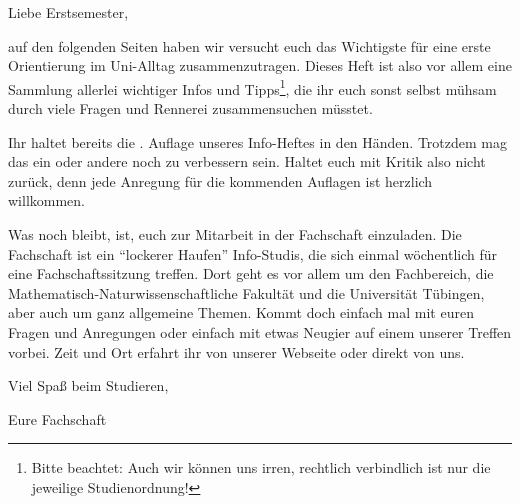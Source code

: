 Liebe Erstsemester,

auf den folgenden Seiten haben wir versucht euch das Wichtigste für eine
erste Orientierung im Uni-Alltag zusammenzutragen. Dieses Heft
ist also vor allem eine Sammlung allerlei wichtiger Infos und Tipps\footnote{
Bitte beachtet: Auch wir können uns irren, rechtlich verbindlich ist nur die
jeweilige Studienordnung!}, die ihr euch sonst selbst mühsam durch viele Fragen
und Rennerei zusammensuchen müsstet.




Ihr haltet bereits die \number\auflage. Auflage unseres Info-Heftes in den
Händen. Trotzdem mag das ein oder andere noch zu verbessern sein. Haltet
euch mit Kritik also nicht zurück, denn jede Anregung für die kommenden
Auf\/lagen ist herzlich willkommen.

Was noch bleibt, ist, euch zur Mitarbeit in der Fachschaft einzuladen.  Die
Fachschaft ist ein "`lockerer Haufen"' Info-Studis, die sich einmal wöchentlich
für eine Fachschaftssitzung treffen. Dort geht es vor allem um den Fachbereich,
die Mathematisch-Naturwissenschaftliche Fakultät und die Universität Tübingen, 
aber auch um ganz allgemeine Themen. Kommt doch einfach mal mit euren Fragen 
und Anregungen oder einfach mit etwas Neugier auf einem unserer Treffen vorbei.  
Zeit und Ort erfahrt ihr von unserer Webseite oder direkt von uns.

\bigskip

Viel Spaß beim Studieren,

Eure Fachschaft
\vfill
\bigskip

\eject
